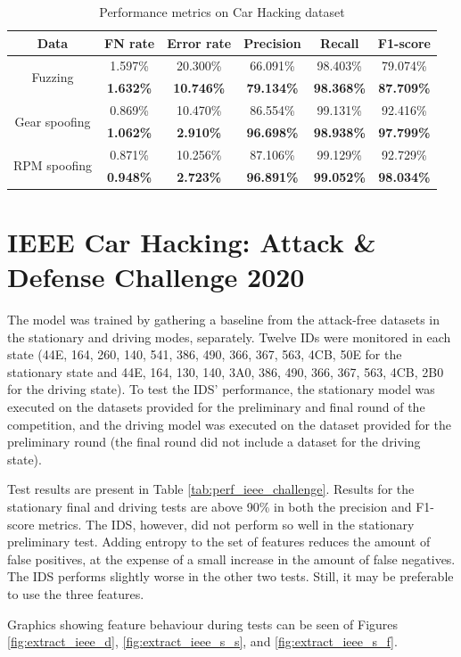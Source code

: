 \begin{table}
    \centering
    \begin{tabular}{*{6}{c}}
        \toprule
        \textbf{Data} & \textbf{FN rate} & \textbf{Error rate} & \textbf{Precision} & \textbf{Recall} & \textbf{F1-score}\\
        \midrule
        \multirow{2}{*}{Fuzzing} & 1.597\% & 20.300\% & 66.091\% & 98.403\% & 79.074\%\\
        & \textbf{1.632\%} & \textbf{10.746\%} & \textbf{79.134\%} & \textbf{98.368\%} & \textbf{87.709\%}\\
        \multirow{2}{*}{Gear spoofing} & 0.869\% & 10.470\% & 86.554\% & 99.131\% & 92.416\%\\
        & \textbf{1.062\%} & \textbf{2.910\%} & \textbf{96.698\%} & \textbf{98.938\%} & \textbf{97.799\%}\\
        \multirow{2}{*}{RPM spoofing} & 0.871\% & 10.256\% & 87.106\% & 99.129\% & 92.729\%\\
        & \textbf{0.948\%} & \textbf{2.723\%} & \textbf{96.891\%} & \textbf{99.052\%} & \textbf{98.034\%}\\
        \bottomrule
    \end{tabular}
    \caption{Performance metrics on Car Hacking dataset}
    \label{tab:perf_car_hacking}
\end{table}

\section{IEEE Car Hacking: Attack \& Defense Challenge 2020}

The model was trained by gathering a baseline from the attack-free datasets in the stationary and driving modes, separately. Twelve IDs were monitored in each state (44E, 164, 260, 140, 541, 386, 490, 366, 367, 563, 4CB, 50E for the stationary state and 44E, 164, 130, 140, 3A0, 386, 490, 366, 367, 563, 4CB, 2B0 for the driving state). To test the IDS' performance, the stationary model was executed on the datasets provided for the preliminary and final round of the competition, and the driving model was executed on the dataset provided for the preliminary round (the final round did not include a dataset for the driving state).\par
Test results are present in Table \ref{tab:perf_ieee_challenge}. Results for the stationary final and driving tests are above 90\% in both the precision and F1-score metrics. The IDS, however, did not perform so well in the stationary preliminary test. Adding entropy to the set of features reduces the amount of false positives, at the expense of a small increase in the amount of false negatives. The IDS performs slightly worse in the other two tests. Still, it may be preferable to use the three features.\par
Graphics showing feature behaviour during tests can be seen of Figures \ref{fig:extract_ieee_d}, \ref{fig:extract_ieee_s_s}, and \ref{fig:extract_ieee_s_f}.

